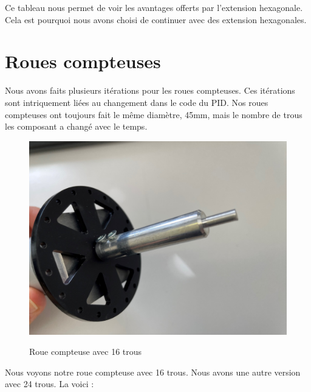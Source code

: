 \documentclass[
	a4paper,									%
	11pt,										%
	twoside,									%
	openright,									%
	notitlepage,									%
	parskip=half,								%
]{scrreprt}										%
\begin{document}
Ce tableau nous permet de voir les avantages offerts par l'extension hexagonale. Cela est pourquoi nous avons 
choisi de continuer avec des extension hexagonales. 

\newpage
\section{Roues compteuses}

Nous avons faits plusieurs itérations pour les roues compteuses. Ces itérations sont intriquement liées au 
changement dans le code du PID. Nos roues compteuses ont toujours fait le même diamètre, 45mm, mais le nombre
de trous les composant a changé avec le temps. 

\begin{figure}[!h]
	\centering
	\includegraphics[scale=.1]{img/ExtensionArbreMoteur.jpg}
	\label{RoueCompteuse}
	\caption{Roue compteuse avec 16 trous}
\end{figure}

Nous voyons notre roue compteuse avec 16 trous. Nous avons une autre version avec 24 trous. La voici : 
\end{document}
